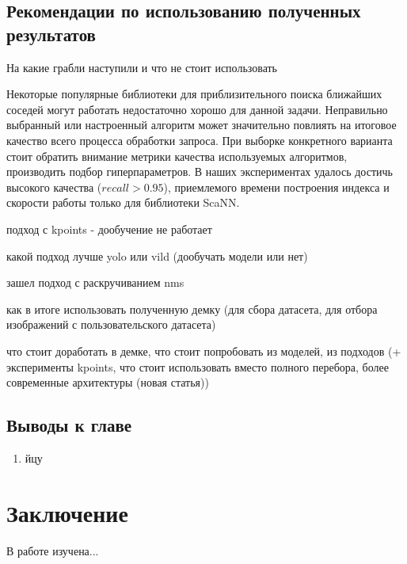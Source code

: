 \documentclass[a4paper,14pt]{article}
\begin{document}
    \subsection{Рекомендации по использованию полученных результатов}

    На какие грабли наступили и что не стоит использовать

    Некоторые популярные библиотеки для приблизительного поиска ближайших соседей могут работать недостаточно хорошо для данной задачи.
    Неправильно выбранный или настроенный алгоритм может значительно повлиять на итоговое качество всего процесса обработки запроса.
    При выборке конкретного варианта стоит обратить внимание метрики качества используемых алгоритмов, производить подбор гиперпараметров.
    В наших экспериментах удалось достичь высокого качества ($recall > 0.95$), приемлемого времени построения индекса и скорости работы только для библиотеки ScaNN.


    подход с kpoints - дообучение не работает

    какой подход лучше yolo или vild (дообучать модели или нет)

    зашел подход с раскручиванием nms

    как в итоге использовать полученную демку (для сбора датасета, для отбора изображений с пользовательского датасета)

    что стоит доработать в демке, что стоит попробовать из моделей, из подходов (+ эксперименты kpoints, что стоит использовать вместо полного перебора, более современные архитектуры (новая статья))

    \subsection{Выводы к главе \thesection}
    \begin{enumerate}
        [1)]
        \itemsep0em
        \item йцу
    \end{enumerate}

    \newpage


    \section{Заключение}

    В работе изучена...

    \newpage
    \renewcommand{\refname}{{\normalsize \hfill Список использованных источников \hfill}}
%    
    
    
    \newpage
\end{document}
